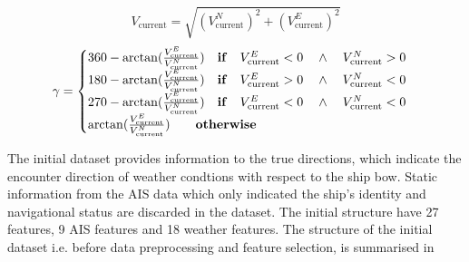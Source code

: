 \begin{equation}\label{eqn:vcurrabs}
    V_{\text{current}} = \sqrt{(V_{\text{current}}^N)^2 + (V_{\text{current}}^E)^2} 
\end{equation}
\begin{equation}\label{eqn:currdir}
    \gamma = 
    \begin{cases}
        360 - \arctan(\frac{V_{\text{current}}^E}{V_{\text{current}}^N}) \quad \text{\textbf{if}} \quad V_{\text{current}}^E < 0 \quad \wedge \quad V_{\text{current}}^N > 0 \\ 
        180 - \arctan(\frac{V_{\text{current}}^E}{V_{\text{current}}^N}) \quad \text{\textbf{if}} \quad V_{\text{current}}^E > 0 \quad \wedge \quad V_{\text{current}}^N < 0 \\ 
        270 - \arctan(\frac{V_{\text{current}}^E}{V_{\text{current}}^N}) \quad \text{\textbf{if}} \quad V_{\text{current}}^E < 0 \quad \wedge \quad V_{\text{current}}^N < 0 \\
        \arctan(\frac{V_{\text{current}}^E}{V_{\text{current}}^N}) \qquad \text{\textbf{otherwise}} 
    \end{cases}   
\end{equation}

The initial dataset provides information to the true directions, which indicate the encounter direction of weather condtions with respect to the ship bow. Static information from the AIS data which only indicated the ship's identity and navigational status are discarded in the dataset. The initial structure have 27 features, 9 AIS features and 18 weather features. The structure of the initial dataset i.e. before data preprocessing and feature selection, is summarised in  \\

